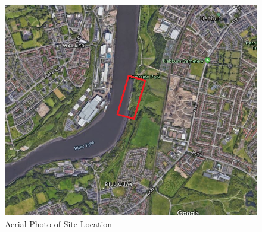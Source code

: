 \documentclass[12pt, a4paper]{article}
\begin{document}
\begin{figure}[H]
  \centering
  	\includegraphics[width=0.5\textheight]{maloneysite}
   	\caption{Aerial Photo of Site Location}
	\label{site}
\end{figure}
\end{document}
